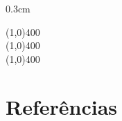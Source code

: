 \begin{refsection}
\begin {myindentpar}{0.3cm}
\begin{enumerate}[\itshape i.]
\begin{center}
\line(1,0){400}\\
\line(1,0){400}\\
\line(1,0){400}\\
\end{center}

\end{enumerate}
\end{myindentpar}



\newpage
\section{Referências}\label{tut14:refs}
\printbibliography[heading=none]
\end{refsection}
%
